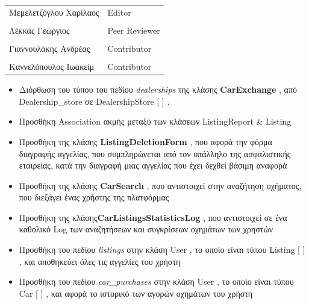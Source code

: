 \documentclass{../ol-softwaremanual}
\begin{document}
	
	\vspace{20pt}
	
	\begin{table}[htbp!]
		\begin{tabular}{ll}
			Μεμελετζόγλου Χαρίλαος & \en Editor \\
			\\ Λέκκας Γεώργιος      &   \en  Peer Reviewer \\
			\\ Γιαννουλάκης Ανδρέας & \en Contributor \\
			\\ Καννελόπουλος Ιωακείμ & \en Contributor \\ 
		\end{tabular}
	\end{table}
	
	
	\vspace{10pt}
	\flushleft
	
	\begin{itemize}
	\item Διόρθωση του τύπου του πεδίου \en \textit{dealerships} \gr της κλάσης \en \textbf{CarExchange} \gr, από \en Dealership\_store \gr σε \en DealershipStore [ ] \gr.
	
	\item Προσθήκη \en Association \gr ακμής μεταξύ των κλάσεων \en ListingReport \& Listing \gr
	
	\item Προσθήκη της κλάσης \en \textbf{ListingDeletionForm} \gr, που αφορά την φόρμα διαγραφής αγγελίας, που συμπληρώνεται από τον υπάλληλο της ασφαλιστικής εταιρείας, κατά την διαγραφή μιας αγγελίας που έχει δεχθεί βάσιμη αναφορά
	
	\item Προσθήκη της κλάσης \en \textbf{CarSearch} \gr, που αντιστοιχεί στην αναζήτηση οχήματος, που διεξάγει ένας χρήστης της πλατφόρμας
	
	\item Προσθήκη της κλάσης\en \textbf{CarListingsStatisticsLog} \gr, που αντιστοιχεί σε ένα καθολικό Log των αναζητήσεων και συγκρίσεων οχημάτων των χρηστών
	
	\item Προσθήκη του πεδίου \en \textit{listings} \gr στην κλάση \en User \gr, το οποίο είναι τύπου \en Listing [ ] \gr, και αποθηκεύει όλες τις αγγελίες του χρήστη
	
	\item Προσθήκη του πεδίου \en \textit{car\_purchases} \gr στην κλάση \en User \gr, το οποίο είναι τύπου \en Car [ ] \gr, και αφορά το ιστορικό των αγορών οχημάτων του χρήστη
	
	\end{itemize}
	
\end{document}
